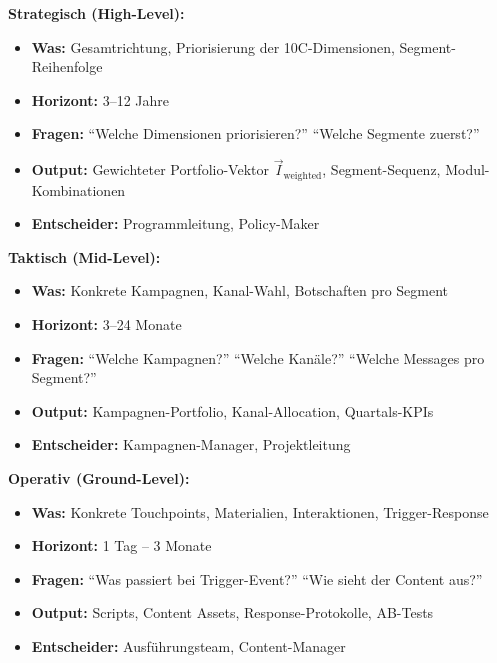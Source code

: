 \begin{tcolorbox}[colback=blue!5!white, colframe=blue!75!black,
    title=\textbf{Die drei Entscheidungsebenen}]

\textbf{Strategisch (High-Level):}
\begin{itemize}[nosep]
\item \textbf{Was:} Gesamtrichtung, Priorisierung der 10C-Dimensionen, Segment-Reihenfolge
\item \textbf{Horizont:} 3--12 Jahre
\item \textbf{Fragen:} ``Welche Dimensionen priorisieren?'' ``Welche Segmente zuerst?''
\item \textbf{Output:} Gewichteter Portfolio-Vektor $\vec{I}_{\text{weighted}}$, Segment-Sequenz, Modul-Kombinationen
\item \textbf{Entscheider:} Programmleitung, Policy-Maker
\end{itemize}

\textbf{Taktisch (Mid-Level):}
\begin{itemize}[nosep]
\item \textbf{Was:} Konkrete Kampagnen, Kanal-Wahl, Botschaften pro Segment
\item \textbf{Horizont:} 3--24 Monate
\item \textbf{Fragen:} ``Welche Kampagnen?'' ``Welche Kanäle?'' ``Welche Messages pro Segment?''
\item \textbf{Output:} Kampagnen-Portfolio, Kanal-Allocation, Quartals-KPIs
\item \textbf{Entscheider:} Kampagnen-Manager, Projektleitung
\end{itemize}

\textbf{Operativ (Ground-Level):}
\begin{itemize}[nosep]
\item \textbf{Was:} Konkrete Touchpoints, Materialien, Interaktionen, Trigger-Response
\item \textbf{Horizont:} 1 Tag -- 3 Monate
\item \textbf{Fragen:} ``Was passiert bei Trigger-Event?'' ``Wie sieht der Content aus?''
\item \textbf{Output:} Scripts, Content Assets, Response-Protokolle, AB-Tests
\item \textbf{Entscheider:} Ausführungsteam, Content-Manager
\end{itemize}

\end{tcolorbox}


